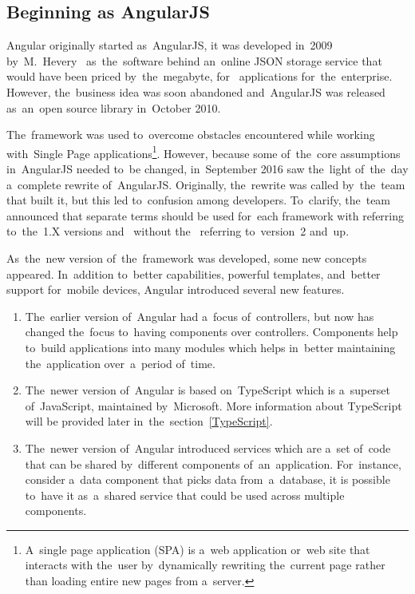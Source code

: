 \subsection{Beginning as AngularJS}
Angular originally started as~AngularJS, it was developed in~2009
by~M.~Hevery~\cite{HeveryAngularJS} as~the~software behind an~online JSON
storage service that would have been priced by~the~megabyte,
for~ applications for~the~enterprise. However, the~business
idea was soon abandoned and~AngularJS was released as~an~open source library
in~October 2010.

The~framework was used to~overcome obstacles encountered while working
with~Single Page applications\footnote{A~single page application (SPA) is a~web
application or~web site that interacts with the~user by~dynamically rewriting
the~current page rather than loading entire new pages from a~server.}.
However, because some of~the~core assumptions in~AngularJS needed to~be changed,
in~September 2016 saw the~light of~the~day a~complete rewrite of~AngularJS.
Originally, the~rewrite was called  by~the~team that built it, but
this led to~confusion among developers. To~clarify, the~team announced that
separate terms should be used for~each framework with  referring
to~the~1.X versions and~ without the~ referring to~version~2
and~up.

As~the~new version of~the~framework was developed, some new concepts appeared.
In~addition to~better  capabilities, powerful templates,
and~better support for~mobile devices, Angular introduced several new features.

\begin{enumerate}
  \item The~earlier version of~Angular had a~focus of~controllers, but now has
  changed the~focus to~having components over controllers. Components help
  to~build applications into many modules which helps in~better maintaining
  the~application over~a~period of~time.
  \item The~newer version of~Angular is based on~TypeScript which is a~superset
  of~JavaScript, maintained by~Microsoft. More information about TypeScript will
  be provided later in~the~section~\ref{TypeScript}.
  \item The~newer version of~Angular introduced services which are a~set of~code
  that can be shared by~different components of~an~application. For~instance,
  consider a~data component that picks data from~a~database, it is possible
  to~have it as~a~shared service that could be used across multiple
  components.
\end{enumerate}


